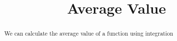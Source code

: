 \documentclass[handout]{ximera}
\title{Average Value}
\begin{document}
\begin{abstract}
	We can calculate the average value of a function using integration
\end{abstract}
\maketitle
\end{document}
